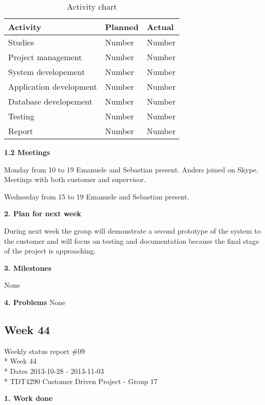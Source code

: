 \begin{table}[H]
\begin{center}
\begin{tabular}{ l | l | l }
  \hline
  Activity & Planned & Actual \\
  \hline\noalign{\smallskip}\noalign{\smallskip}\hline
  Studies & Number & Number \\
  Project management & Number & Number \\
  System developement & Number & Number \\
  Application development & Number & Number \\
  Database developement & Number & Number \\
  Testing & Number & Number \\
  Report & Number & Number \\
  \hline
\end{tabular}
\end{center}
\caption{Activity chart}
\label{table:activityChartStatusReportWeek43}
\end{table}

\textbf{1.2 Meetings}

Monday from 10 to 19
Emanuele and Sebastian present. Anders joined on Skype.
Meetings with both customer and supervisor.

Wednesday from 15 to 19
Emanuele and Sebastian present.

\textbf{2. Plan for next week}

During next week the group will demonstrate a second prototype of the system to the customer and will focus on testing and documentation because the final stage of the project is approaching.

\textbf{3. Milestones}

None

\textbf{4. Problems}
None

\newpage
\subsection{Week 44}

\begin{center}
Weekly status report \#09\\*
Week 44 \\*
Dates 2013-10-28 - 2013-11-03 \\*
TDT4290 Customer Driven Project - Group 17
\end{center}

\textbf{1. Work done}

